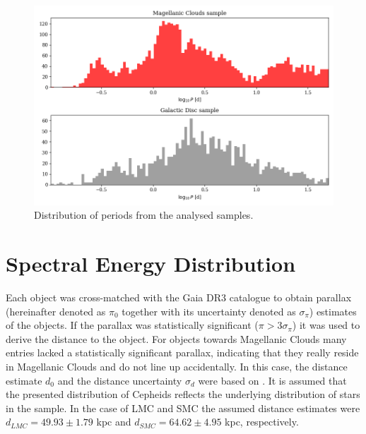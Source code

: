 \documentclass{pracalicmgr}
\begin{document}
\begin{figure}
    \includegraphics[scale=0.5]{plots/periods.png}
    \caption{Distribution of periods from the analysed samples.}
    \label{periods}
\end{figure}


\section{Spectral Energy Distribution}
Each object was cross-matched with the Gaia DR3 catalogue to obtain parallax (hereinafter denoted as $\pi_0$ together with its uncertainty denoted as $\sigma_{\pi}$) estimates of the objects. If the parallax was statistically significant ($\pi>3\sigma_{\pi}$)
it was used to derive the distance to the object. For objects towards Magellanic Clouds many entries lacked a statistically significant parallax, indicating that they really reside in Magellanic Clouds
and do not line up accidentally.
In this case, the distance estimate $d_0$ and the distance uncertainty $\sigma_d$ were based on \citet{jacyszyn-dobrzeniecka_ogle-ing_2016}. It is assumed that the presented distribution
of Cepheids reflects the underlying distribution of stars in the sample.
In the case of LMC and SMC the assumed distance estimates were $d_{LMC}=49.93\pm1.79$ kpc and $d_{SMC}=64.62\pm4.95$ kpc, respectively. 
\end{document}
